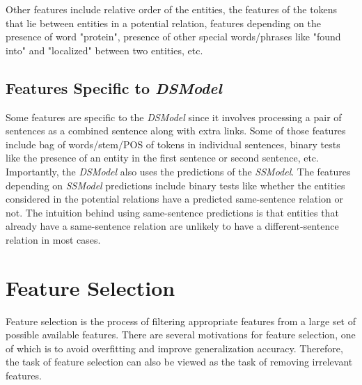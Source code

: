 Other features include relative order of the entities, the features of the tokens that lie between entities in a potential relation, features depending on the presence of word "protein", presence of other special words/phrases like "found into" and "localized" between two entities, etc. %

\subsection*{Features Specific to \textit{DSModel}}

Some features are specific to the \textit{DSModel} since it involves processing a pair of sentences as a combined sentence along with extra links. Some of those features include bag of words/stem/POS of tokens in individual sentences, binary tests like the presence of an entity in the first sentence or second sentence, etc. Importantly, the \textit{DSModel} also uses the predictions of the \textit{SSModel}. The features depending on \textit{SSModel} predictions include binary tests like whether the entities considered in the potential relations have a predicted same-sentence relation or not. The intuition behind using same-sentence predictions is that entities that already have a same-sentence relation are unlikely to have a different-sentence relation in most cases.

\section{Feature Selection}\label{sec:featSel}

Feature selection is the process of filtering appropriate features from a large set of possible available features. There are several motivations for feature selection, one of which is to avoid overfitting and improve generalization accuracy. Therefore, the task of feature selection can also be viewed as the task of removing irrelevant features.

%
%
%

